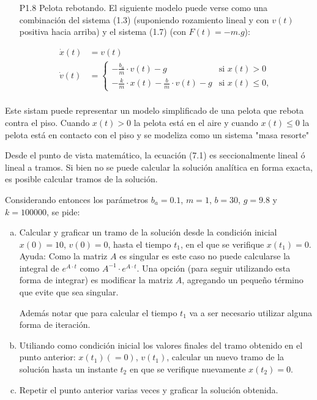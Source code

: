 \documentclass{article}
\begin{document}
\begin{itemize}
   \item[P1.8] Pelota rebotando. El siguiente modelo puede verse como una combinación del sistema (1.3) (suponiendo rozamiento lineal y con $v(t)$ positiva hacia arriba) y el sistema (1.7) (con $F(t)=-m.g$):

\begin{align*}
  \dot{x}(t) &= v(t) \\
 \label{P1.8a} \tag{P1.8a}
  \dot{v}(t) &=   \begin{cases}
    -\frac{b_{a}}{m} \cdot v(t) - g & \text{si } x(t) > 0\\
    -\frac{k}{m} \cdot x(t) - \frac{b}{m} \cdot v(t) - g & \text {si } x(t) \leq 0,
  \end{cases}\\
\end{align*}
\end{itemize}

Este sistam puede representar un modelo simplificado de una pelota que rebota contra el piso. Cuando $x(t) > 0$ la pelota está en el aire y cuando $x(t) \leq 0$ la pelota está en contacto con el piso y se modeliza como un sistema "masa resorte"

Desde el punto de vista matemático, la ecuación (7.1) es seccionalmente lineal ó lineal a tramos. Si bien no se puede calcular la solución analítica en forma exacta, es posible calcular tramos de la solución.

Considerando entonces los parámetros $b_{a} = 0.1$, $m=1$, $b=30$, $g=9.8$ y $k = 100000$, se pide:
\begin{enumerate}[a)]
\item Calcular y graficar un tramo de la solución desde la condición inicial $x(0)=10$, $v(0)=0$, hasta el tiempo $t_{1}$, en el que se verifique $x(t_{1})=0$.
Ayuda: Como la matriz $A$ es singular es este caso no puede calcularse la integral de $e^{A \cdot t}$ como $A^{-1} \cdot e^{A \cdot t}$. Una opción (para seguir utilizando esta forma de integrar) es modificar la matriz $A$, agregando un pequeño término que evite que sea singular.

Además notar que para calcular el tiempo $t_{1}$ va a ser necesario utilizar alguna forma de iteración.

\item Utiliando como condición inicial los valores finales del tramo obtenido en el punto anterior: $x(t_{1})(=0)$, $v(t_{1})$, calcular un nuevo tramo de la solución hasta un instante $t_{2}$ en que se verifique nuevamente $x(t_{2})=0$.

\item Repetir el punto anterior varias veces y graficar la solución obtenida.
\end{enumerate}
\end{document}
